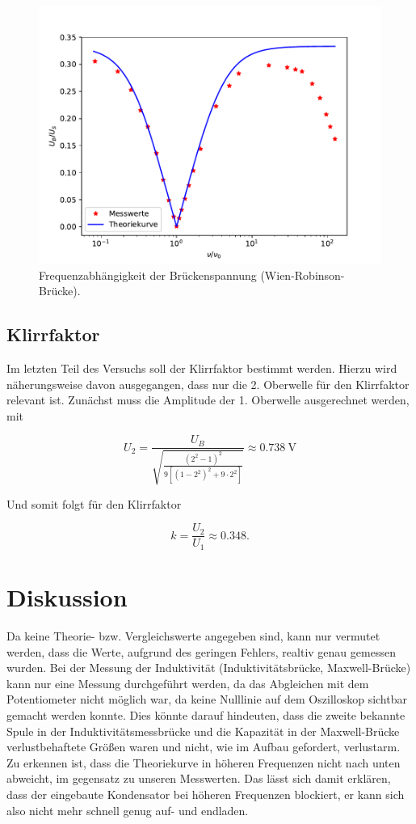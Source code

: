 \begin{figure}
  \centering
  \includegraphics[scale=0.7]{plotFrequenz.pdf}
  \caption{Frequenzabhängigkeit der Brückenspannung (Wien-Robinson-Brücke).}
  \label{fig:1}
\end{figure}

\subsection{Klirrfaktor}
Im letzten Teil des Versuchs soll der Klirrfaktor bestimmt werden. Hierzu wird näherungsweise davon ausgegangen,
dass nur die 2. Oberwelle für den Klirrfaktor relevant ist.
Zunächst muss die Amplitude der 1. Oberwelle ausgerechnet werden, mit

\begin{equation*}
  U_2 = \frac{U_B}{\sqrt{\frac{(2^2 -1)^2}{9 [(1-2^2)^2 + 9 \cdot 2^2]}}} \approx \SI{0.738}{\volt}
\end{equation*}

Und somit folgt für den Klirrfaktor

\begin{equation*}
  k = \frac{U_2}{U_1} \approx 0.348 .
\end{equation*}

\section{Diskussion}
Da keine Theorie- bzw. Vergleichswerte angegeben sind, kann nur vermutet werden, dass die Werte, aufgrund des geringen Fehlers, realtiv genau
gemessen wurden.
Bei der Messung der Induktivität (Induktivitätsbrücke, Maxwell-Brücke) kann nur eine Messung durchgeführt werden, da das Abgleichen mit
dem Potentiometer nicht möglich war, da keine Nulllinie auf dem Oszilloskop sichtbar gemacht werden konnte. Dies könnte darauf hindeuten, dass
die zweite bekannte Spule in der Induktivitätsmessbrücke und die Kapazität in der Maxwell-Brücke verlustbehaftete Größen waren und nicht,
wie im Aufbau gefordert, verlustarm.
Zu erkennen ist, dass die Theoriekurve in höheren Frequenzen nicht nach unten abweicht, im gegensatz zu unseren Messwerten.
Das lässt sich damit erklären, dass der eingebaute Kondensator bei höheren Frequenzen blockiert, er kann sich also nicht mehr
schnell genug auf- und endladen.



\nocite{*}
\printbibliography
